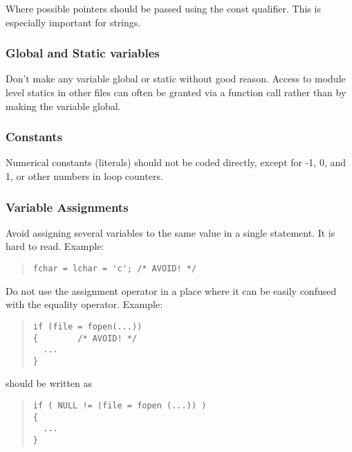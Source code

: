 \documentclass{article}
\begin{document}
Where possible pointers should be passed using the const qualifier.
This is especially important for strings.

\subsubsection{Global and Static variables}

Don't make any variable global or static without good
reason.  Access to module level statics in other files can often
be granted via a function call rather than by making the variable global.

\subsubsection{Constants}

Numerical constants (literals) should not be coded directly, except
for -1, 0, and 1, or other numbers in loop counters.

\subsubsection{Variable Assignments}

Avoid assigning several variables to the same value in a single
statement. It is hard to read. Example:

\begin{quote}
\begin{verbatim}
fchar = lchar = 'c'; /* AVOID! */
\end{verbatim}
\end{quote}

Do not use the assignment operator in a place where it can be easily
confused with the equality operator. Example:

\begin{quote}
\begin{verbatim}
if (file = fopen(...)) 
{        /* AVOID! */
  ...
}

\end{verbatim}
\end{quote}

should be written as 

\begin{quote}
\begin{verbatim}
if ( NULL != (file = fopen (...)) ) 
{
  ...
}

\end{verbatim}

\end{quote}
\end{document}
